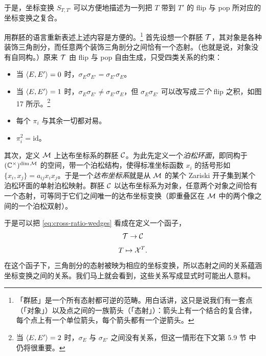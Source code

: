 于是，坐标变换 $S_{T,T'}$ 可以方便地描述为一列把 $T$ 带到 $T'$ 的 flip 与 pop 所对应的坐标变换之复合。

用群胚的语言重新表述上述内容是方便的。\footnote{「群胚」是一个所有态射都可逆的范畴。用白话讲，这只是说我们有一套点（「对象」）以及点之间的一族箭头（「态射」）：箭头上有一个结合的复合律，每个点上有一个单位箭头，每个箭头都有一个逆箭头。} 首先设想一个群胚 $\mathcal{T}$，其对象是各种装饰三角剖分，而任意两个装饰三角剖分之间恰有一个态射。（也就是说，对象没有自同构。）原来 $\mathcal{T}$ 由 flip 与 pop 自由生成，只受四类关系的约束：
\begin{itemize}
\item 当 $\langle E,E' \rangle=0$ 时，$\sigma_E\sigma_{E'}=\sigma_{E'}\sigma_E$。

\item 当 $\langle E,E' \rangle=1$ 时，$\sigma_E\sigma_{E'}\neq\sigma_{E'}\sigma_E$，但 $\sigma_E\sigma_{E'}$ 可以改写成\emph{三个} flip 之积，如图 17%
所示。\footnote{当 $\langle E,E' \rangle=2$ 时，$\sigma_E$ 与 $\sigma_{E'}$ 之间没有关系，但这一情形在下文第 5.9 节%
中仍将很重要。}

\item 每个 $\pi_i$ 与其余一切都对易。

\item $\pi_i^2=\mathrm{id}$。

\end{itemize}


其次，定义 $\mathcal{M}$ 上达布坐标系的群胚 $\mathcal{C}$。为此先定义一个\emph{泊松环面}，即同构于 $(\mathbb{C}^\times)^{\dim\mathcal{M}}$ 的空间，带一个泊松结构，使得标准坐标函数 $x_i$ 的括号形如 $\{x_i,x_j\}=a_{ij}x_ix_j$。于是一个\emph{达布坐标系}就是从 $\mathcal{M}$ 的某个 Zariski 开子集到某个泊松环面的单射泊松映射。群胚 $\mathcal{C}$ 以达布坐标系为对象，任意两个对象之间恰有一个态射，可等同于它们之间唯一的达布坐标变换（即重叠区在 $\mathcal{M}$ 中的两个像之间的一个泊松双射）。

于是可以把 \eqref{eq:cross-ratio-wedges} 看成在定义一个函子，
\begin{equation}
\mathcal{T} \to \mathcal{C}
\end{equation}
\begin{equation}
T \mapsto \mathcal{X}^T.
\end{equation}
在这个函子下，三角剖分的态射被映为相应的坐标变换，所以态射之间的关系蕴涵坐标变换之间的关系。我们马上就会看到，这些关系写成显式时可能出人意料。

